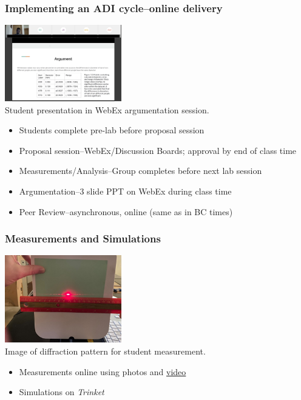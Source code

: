 \documentclass[aspectratio=169]{beamer}
\begin{document}
\begin{frame}
\frametitle{Implementing an ADI cycle--online delivery}
\begin{center}
\includegraphics[width=2in]{WebExArgumentation.png}\\
{\footnotesize Student presentation in WebEx argumentation session.}
\end{center}
\begin{itemize}
\item<+-> Students complete pre-lab before proposal session
\item<+-> Proposal session--WebEx/Discussion Boards; approval by end of class time
\item<+-> Measurements/Analysis--Group completes before next lab session
\item<+-> Argumentation--3 slide PPT on WebEx during class time
\item<+-> Peer Review--asynchronous, online (same as in BC times)
\end{itemize}
\end{frame}

\begin{frame}
\frametitle{Measurements and Simulations}
\begin{center}
\includegraphics[width=2in]{Hair1_red_pattern.jpg}\\
{\footnotesize Image of diffraction pattern for student measurement.}
\end{center}
\begin{itemize}
\item Measurements online using photos and \href{run:Spring4_100g.mp4}{video}
\item Simulations on \emph{Trinket}
\end{itemize}
\end{frame}
\end{document}
